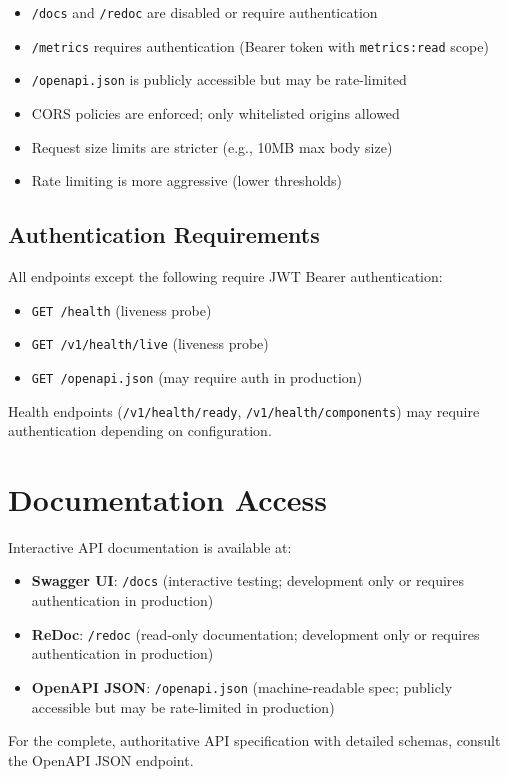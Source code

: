 \begin{itemize}
    \item \texttt{/docs} and \texttt{/redoc} are disabled or require authentication
    \item \texttt{/metrics} requires authentication (Bearer token with \texttt{metrics:read} scope)
    \item \texttt{/openapi.json} is publicly accessible but may be rate-limited
    \item CORS policies are enforced; only whitelisted origins allowed
    \item Request size limits are stricter (e.g., 10MB max body size)
    \item Rate limiting is more aggressive (lower thresholds)
\end{itemize}

\subsection{Authentication Requirements}

All endpoints except the following require JWT Bearer authentication:

\begin{itemize}
    \item \texttt{GET /health} (liveness probe)
    \item \texttt{GET /v1/health/live} (liveness probe)
    \item \texttt{GET /openapi.json} (may require auth in production)
\end{itemize}

Health endpoints (\texttt{/v1/health/ready}, \texttt{/v1/health/components}) may require authentication depending on configuration.

\section{Documentation Access}
\label{app:api:docs}

Interactive API documentation is available at:

\begin{itemize}
    \item \textbf{Swagger UI}: \texttt{/docs} (interactive testing; development only or requires authentication in production)
    \item \textbf{ReDoc}: \texttt{/redoc} (read-only documentation; development only or requires authentication in production)
    \item \textbf{OpenAPI JSON}: \texttt{/openapi.json} (machine-readable spec; publicly accessible but may be rate-limited in production)
\end{itemize}

For the complete, authoritative API specification with detailed schemas, consult the OpenAPI JSON endpoint.

